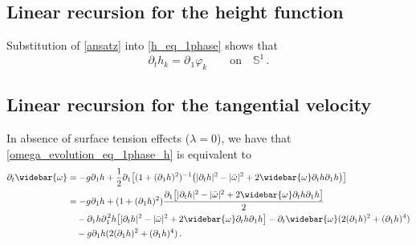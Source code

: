\documentclass[11pt]{article}
\theoremstyle{plain}
\theoremstyle{definition}
\theoremstyle{definition}
\def\p{\text{\bf\emph{p}}}
\def\p{{\partial\hspace{1pt}}}
\begin{document}
\subsection{Linear recursion for the height function}
Substitution of \eqref{ansatz} into \eqref{h_eq_1phase} shows that
\begin{equation}\label{hk_ww}
\partial_{t} h_k = \p_{\!1} \varphi_k \qquad\text{on}\quad \mathbb{S}^1\,.
\end{equation}

\subsection{Linear recursion for  the  tangential velocity}
In absence of surface tension effects ($\lambda=0$), we have that \eqref{omega_evolution_eq_1phase_h} is equivalent to
\begin{align}
\partial_t \widebar{\omega} &= - g \p_{\!1} h + \frac{1}{2} \p_{\!1} \big[(1+(\p_{\!1} h)^2) ^{-1} \big(|\partial_t h|^2  - |\bar \omega|^2 + 2 \widebar{\omega} \partial_t h \p_{\!1} h\big) \big]\nonumber\\
&= - g \p_{\!1} h + (1+(\p_{\!1} h)^2)\frac{\p_{\!1} \big[ |\partial_t h|^2  - |\bar \omega|^2 + 2 \widebar{\omega} \partial_t h \p_{\!1} h \big]}{2}\nonumber\\
&\quad-\p_{\!1} h\p_{\!1}^2h\big[ |\partial_t h|^2  - |\bar \omega|^2 + 2 \widebar{\omega} \partial_t h \p_{\!1} h \big]  -\partial_t \widebar{\omega}(2(\partial_1 h)^2+(\partial_1 h)^4)\nonumber\\
&\quad -g\partial_1 h(2(\partial_1 h)^2+(\partial_1 h)^4)\label{omega_evolution_eq_1phase_h2}\,.
\end{align}
\end{document}
